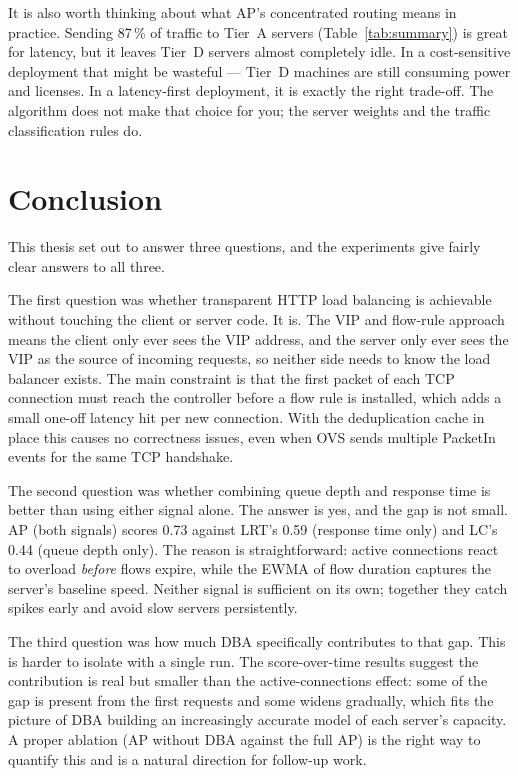 \documentclass[10pt,a4paper,twocolumn]{article}
\numberwithin{figure}{section}
\numberwithin{table}{section}
\numberwithin{equation}{section}
\begin{document}
It is also worth thinking about what AP's concentrated routing means in practice.
Sending 87\,\% of traffic to Tier~A servers (Table~\ref{tab:summary}) is
great for latency, but it leaves Tier~D servers almost completely idle.
In a cost-sensitive deployment that might be wasteful — Tier~D machines are
still consuming power and licenses. In a latency-first deployment, it is
exactly the right trade-off. The algorithm does not make that choice for you;
the server weights and the traffic classification rules do.

\section{Conclusion}
\label{sec:conclusion}

This thesis set out to answer three questions, and the experiments give fairly
clear answers to all three.

The first question was whether transparent HTTP load balancing is achievable
without touching the client or server code. It is. The VIP and flow-rule
approach means the client only ever sees the VIP address, and the server only
ever sees the VIP as the source of incoming requests, so neither side needs to
know the load balancer exists. The main constraint is that the first packet of
each TCP connection must reach the controller before a flow rule is installed,
which adds a small one-off latency hit per new connection. With the deduplication
cache in place this causes no correctness issues, even when OVS sends multiple
PacketIn events for the same TCP handshake.

The second question was whether combining queue depth and response time is better
than using either signal alone. The answer is yes, and the gap is not small.
AP (both signals) scores 0.73 against LRT's 0.59 (response time only) and LC's
0.44 (queue depth only). The reason is straightforward: active connections react
to overload \emph{before} flows expire, while the EWMA of flow duration captures
the server's baseline speed. Neither signal is sufficient on its own; together
they catch spikes early and avoid slow servers persistently.

The third question was how much DBA specifically contributes to that gap. This
is harder to isolate with a single run. The score-over-time results suggest the
contribution is real but smaller than the active-connections effect: some of the
gap is present from the first requests and some widens gradually, which fits the
picture of DBA building an increasingly accurate model of each server's capacity.
A proper ablation (AP without DBA against the full AP) is the right way to
quantify this and is a natural direction for follow-up work.
\end{document}

